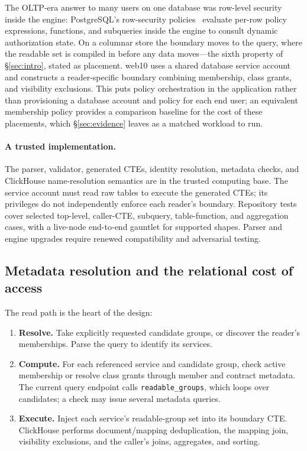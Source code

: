 \documentclass[sigconf, nonacm]{acmart}
\begin{document}
The OLTP-era answer to many users on one database was row-level security
inside the engine: PostgreSQL's row-security
policies~\cite{postgres-rls} evaluate per-row policy expressions, functions,
and subqueries inside the engine to consult dynamic authorization state.
On a columnar store the boundary moves to the query, where the readable set
is compiled in before any data moves---the sixth property of
\S\ref{sec:intro}, stated as placement. web10 uses a shared database service
account and constructs a reader-specific boundary combining membership,
class grants, and visibility exclusions. This puts policy orchestration in
the application rather than provisioning a database account and policy for
each end user; an equivalent membership policy provides a comparison
baseline for the cost of these placements, which \S\ref{sec:evidence} leaves
as a matched workload to run.

\paragraph{A trusted implementation.} The parser, validator, generated CTEs,
identity resolution, metadata checks, and ClickHouse name-resolution
semantics are in the trusted computing base. The service account must read
raw tables to execute the generated CTEs; its privileges do not
independently enforce each reader's boundary. Repository tests cover
selected top-level, caller-CTE, subquery, table-function, and aggregation
cases, with a live-node end-to-end gauntlet for supported shapes. Parser and
engine upgrades require renewed compatibility and adversarial testing.

\subsection{Metadata resolution and the relational cost of access}

The read path is the heart of the design:

\begin{enumerate}[leftmargin=*,nosep]
  \item \textbf{Resolve.} Take explicitly requested candidate groups, or
  discover the reader's memberships. Parse the query to identify its
  services.
  \item \textbf{Compute.} For each referenced service and candidate group,
  check active membership or resolve class grants through member and
  contract metadata. The current query endpoint calls
  \texttt{readable\_groups}, which loops over candidates; a check may issue
  several metadata queries.
  \item \textbf{Execute.} Inject each service's readable-group set into its
  boundary CTE. ClickHouse performs document/mapping deduplication, the
  mapping join, visibility exclusions, and the caller's joins, aggregates,
  and sorting.
\end{enumerate}
\end{document}
